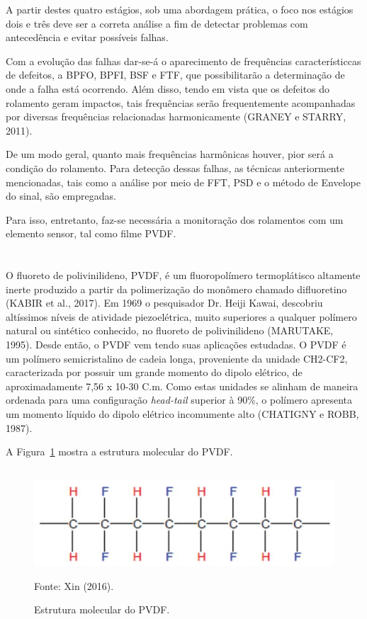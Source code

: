 \documentclass[
	12pt,				
	oneside,			
	a4paper,			
	english,			
	brazil,			
	]{abntex2ppgsi}
\begin{document}
A partir destes quatro estágios, sob uma abordagem prática, o foco nos estágios dois e três deve ser a correta análise a fim de detectar problemas com antecedência e evitar possíveis falhas. 

Com a evolução das falhas dar-se-á o aparecimento de frequências característiccas de defeitos, a BPFO, BPFI, BSF e FTF, que possibilitarão a determinação de onde a falha está ocorrendo. Além disso, tendo em vista que os defeitos do rolamento geram impactos, tais frequências serão frequentemente acompanhadas por diversas frequências relacionadas harmonicamente (GRANEY e STARRY, 2011). 

De um modo geral, quanto mais frequências harmônicas houver, pior será a condição do rolamento. Para detecção dessas falhas, as técnicas anteriormente mencionadas, tais como a análise por meio de FFT, PSD e o método de Envelope do sinal, são empregadas. 

Para isso, entretanto, faz-se necessária a monitoração dos rolamentos com um elemento sensor, tal como filme PVDF.

\newpage
\section{}
\label{secao:PVDF}

O fluoreto de polivinilideno, PVDF, é um fluoropolímero termoplátisco altamente inerte produzido a partir da polimerização do monômero chamado difluoretino (KABIR et al., 2017). Em 1969 o pesquisador Dr. Heiji Kawai, descobriu altíssimos níveis de atividade piezoelétrica, muito superiores a qualquer polímero natural ou sintético conhecido, no fluoreto de polivinilideno (MARUTAKE, 1995). Desde então, o PVDF vem tendo suas aplicações estudadas. O PVDF é um polímero semicristalino de cadeia longa, proveniente da unidade CH2-CF2, caracterizada por possuir um grande momento do dipolo elétrico, de aproximadamente 7,56 x 10-30 C.m. Como estas unidades se alinham de maneira ordenada para uma configuração \textit{head-tail} superior à 90\%, o polímero apresenta um momento líquido do dipolo elétrico incomumente alto (CHATIGNY e ROBB, 1987).

A Figura~\ref{pvdf_cadeia} mostra a estrutura molecular do PVDF.

\begin{figure}[H]
\centering
\caption {Estrutura molecular do PVDF.}
\includegraphics[width=\textwidth,height=40mm,keepaspectratio]{pvdf_cadeia} \\
Fonte: Xin (2016).
\label{pvdf_cadeia}
\end{figure}
\end{document}
